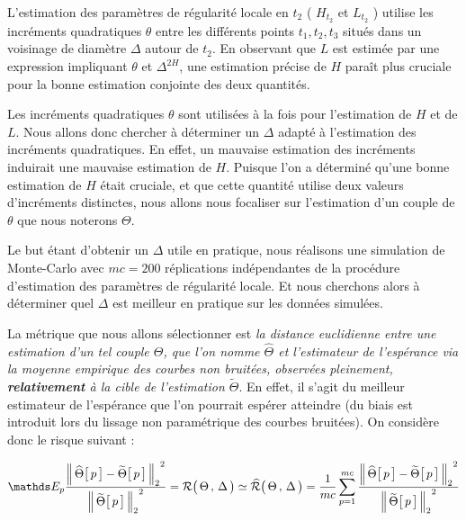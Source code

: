 
L'estimation des paramètres de régularité locale en $t_2$ ( $H_{t_2}$ et $L_{t_2}$ ) utilise les incréments quadratiques $\theta$ entre les différents points $t_1, t_2, t_3$ situés dans un voisinage de diamètre $\Delta$ autour de $t_2$.
En observant que $L$ est estimée par une expression impliquant $\theta$ et $\Delta^{2 H}$, une estimation précise de $H$ paraît plus cruciale pour la bonne estimation conjointe des deux quantités. 


Les incréments quadratiques $\theta$ sont utilisées à la fois pour l'estimation de $H$ et de $L$. Nous allons donc chercher à déterminer un $\Delta$ adapté à l'estimation des incréments quadratiques. En effet, un mauvaise estimation des incréments induirait une mauvaise estimation de $H$. Puisque l'on a déterminé qu'une bonne estimation de $H$ était cruciale, et que cette quantité utilise deux valeurs d'incréments distinctes, nous allons nous focaliser sur l'estimation d'un couple de $\theta$ que nous noterons $\Theta$.

\bigskip

Le but étant d'obtenir un $\Delta$ utile en pratique, nous réalisons une simulation de Monte-Carlo avec $mc=200$ réplications indépendantes de la procédure d'estimation des paramètres de régularité locale. Et nous cherchons alors à déterminer quel $\Delta$ est meilleur en pratique sur les données simulées.

\bigskip

La métrique que nous allons sélectionner est \emph{la distance euclidienne entre une estimation d'un tel couple $\Theta$, que l'on nomme $\widehat \Theta$ et l'estimateur de l'espérance via la moyenne empirique des courbes non bruitées, observées pleinement, \textbf{relativement} à la cible de l'estimation $\widetilde \Theta$}. En effet, il s'agit du meilleur estimateur de l'espérance que l'on pourrait espérer atteindre (du biais est introduit lors du lissage non paramétrique des courbes bruitées). On considère donc le risque suivant :


\begin{equation}
	{\mathds E_p} \frac{{\distnorme 2 {\widehat \Theta\bigl[\, p \,\bigr]} {\widetilde \Theta \bigl[ \,p \,\bigr]}}^2}{{\norme 2 {\widetilde \Theta \bigl[ \,p \,\bigr]}}^2}
	=
	{\mathcal R} \bigl( \, \Theta \, , \, \Delta \, \bigr)
	\simeq
	\widehat{\mathcal R} \bigl( \, \Theta \, , \, \Delta \, \bigr)
	=
	\frac 1 {mc} \sum\limits_{p=1}^{mc} \frac{{\distnorme 2 {\widehat \Theta\bigl[\, p \,\bigr]} {\widetilde \Theta \bigl[ \,p \,\bigr]}}^2}{{\norme 2 {\widetilde \Theta \bigl[ \,p \,\bigr]}}^2}
\end{equation}


